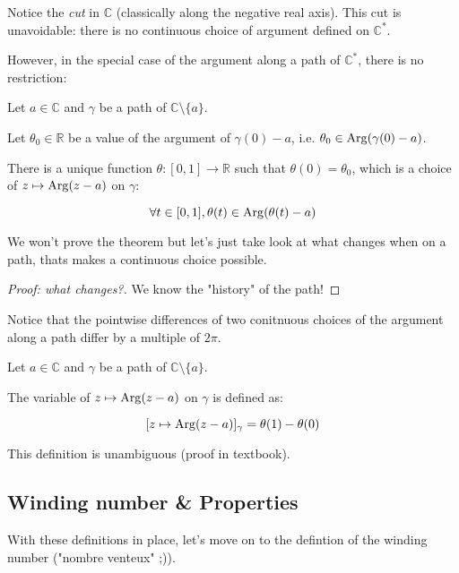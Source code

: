 \begin{note}
    Notice the \emph{cut} in $\mathbb{C}$ (classically along the negative real axis). This cut is unavoidable: there is no continuous choice of argument defined on $\mathbb{C}^*$.
\end{note}

However, in the special case of the argument along a path of $\mathbb{C}^*$, there is no restriction:

\begin{thm*}
    Let $a\in\mathbb{C}$ and $\gamma$ be a path of $\mathbb{C} \setminus \lbrace a \rbrace$.

    Let $\theta_0\in\mathbb{R}$ be a value of the argument of $\gamma(0) - a$, i.e. $\theta_0 \in \operatorname{Arg}(\gamma(0) - a)$.

    There is a unique function $\theta: [0,1] \rightarrow \mathbb{R}$ such that $\theta(0) = \theta_0$, which is a choice of $z \mapsto \operatorname{Arg}(z-a)$ on $\gamma$:

    $$\forall t \in [0,1], \theta(t) \in \operatorname{Arg}(\theta(t) - a) $$
\end{thm*}

We won't prove the theorem but let's just take look at what changes when on a path, thats makes a continuous choice possible.

\begin{proof}[Proof: what changes?]
We know the "history" of the path!
\end{proof}

\begin{note}
    Notice that the pointwise differences of two conitnuous choices of the argument along a path differ by a multiple of $2\pi$.
\end{note}

\begin{defi}
    Let $a\in\mathbb{C}$ and $\gamma$ be a path of $\mathbb{C} \setminus \lbrace a \rbrace$.

    The variable of $z \mapsto \operatorname{Arg}(z-a)$ on $\gamma$ is defined as:

    $$[z \mapsto \operatorname{Arg}(z-a)]_\gamma = \theta(1) - \theta(0) $$

    This definition is unambiguous (proof in textbook).
\end{defi}

\subsection{Winding number \& Properties}
With these definitions in place, let's move on to the defintion of the winding number ("nombre venteux" ;)). 

